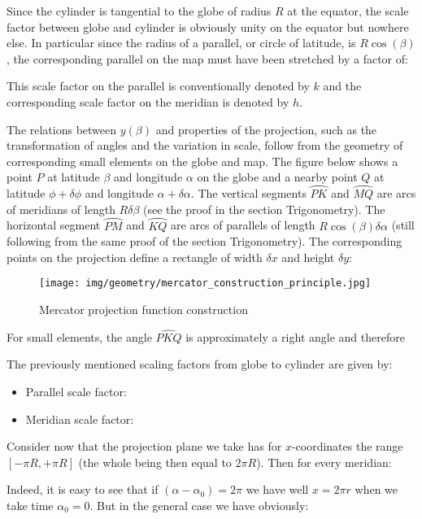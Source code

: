 	Since the cylinder is tangential to the globe of radius $R$ at the equator, the scale factor between globe and cylinder is obviously unity on the equator but nowhere else. In particular since the radius of a parallel, or circle of latitude, is $R\cos(\beta)$, the corresponding parallel on the map must have been stretched by a factor of:
	
	This scale factor on the parallel is conventionally denoted by $k$ and the corresponding scale factor on the meridian is denoted by $h$.
	
	The relations between $y(\beta)$ and properties of the projection, such as the transformation of angles and the variation in scale, follow from the geometry of corresponding small elements on the globe and map. The figure below shows a point $P$ at latitude $\beta$ and longitude $\alpha$ on the globe and a nearby point $Q$ at latitude $\phi + \delta \phi$ and longitude $\alpha + \delta \alpha$. The vertical segments $\wideparen{PK}$ and $\wideparen{MQ}$ are arcs of meridians of length $R\delta \beta$ (see the proof in the section Trigonometry). The horizontal segment $\wideparen{PM}$ and $\wideparen{KQ}$ are arcs of parallels of length $R\cos(\beta)\delta\alpha$ (still following from the same proof of the section Trigonometry). The corresponding points on the projection define a rectangle of width $\delta x$ and height $\delta y$:
	\begin{figure}[H]
		\centering
		\texttt{[image: img/geometry/mercator\_construction\_principle.jpg]}
		\caption{Mercator projection function construction}
	\end{figure}
	For small elements, the angle $\widehat{PKQ}$ is approximately a right angle and therefore
	
	The previously mentioned scaling factors from globe to cylinder are given by:
	\begin{itemize}
		\item Parallel scale factor: 
		 

		\item Meridian scale factor:
		 
	\end{itemize}
	Consider now that the projection plane we take has for $x$-coordinates the range $[-\pi R,+\pi R]$ (the whole being then equal to $2\pi R$). Then for every meridian:
	 
	Indeed, it is easy to see that if $(\alpha-\alpha_0)=2\pi$ we have well $x=2\pi r$ when we take time $\alpha_0=0$. But in the general case we have obviously:
	 
